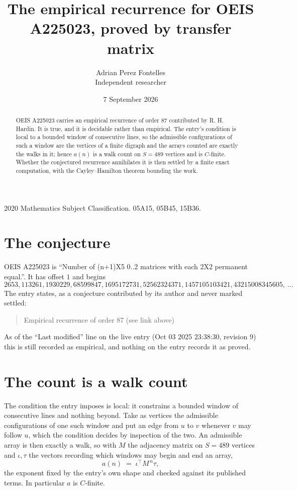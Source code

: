 \documentclass[11pt,a4paper]{article}
\title{The empirical recurrence for OEIS A225023, proved by transfer matrix}
\author{Adrian Perez Fontelles\\ \small Independent researcher}
\date{7 September 2026}
\theoremstyle{plain}
\theoremstyle{definition}
\begin{document}
\maketitle

\begin{abstract}
OEIS A225023 carries an empirical recurrence of order $87$ contributed by R. H. Hardin. It is
true, and it is decidable rather than empirical. The entry's condition is local to a bounded window of consecutive lines, so
the admissible configurations of such a window are the vertices of a finite digraph and the
arrays counted are exactly the walks in it; hence $a(n)$ is a walk count on $S=489$ vertices
and is $C$-finite. Whether the conjectured recurrence annihilates it is then settled by a
finite exact computation, with the Cayley--Hamilton theorem bounding the work.
\end{abstract}

\noindent\small 2020 Mathematics Subject Classification. 05A15, 05B45, 15B36.\normalsize

\section{The conjecture}

OEIS A225023 is ``Number of (n+1)X5 0..2 matrices with each 2X2 permanent equal.''. It has offset $1$ and begins
\[
2653, 113261, 1930229, 68599847, 1695172731, 52562324371, 1457105103421, 43215008345605,\ \dots
\]
The entry states, as a conjecture contributed by its author and never marked settled:
\begin{quote}
Empirical recurrence of order 87 (see link above)
\end{quote}
As of the ``Last modified'' line on the live entry (Oct 03 2025 23:38:30, revision 9) this is still
recorded as empirical, and nothing on the entry records it as proved.

\section{The count is a walk count}

The condition the entry imposes is local: it constrains a bounded window of consecutive lines and nothing beyond. Take as
vertices the admissible configurations of one such window and put an edge from $u$ to $v$
whenever $v$ may follow $u$, which the condition decides by inspection of the two. An
admissible array is then exactly a walk, so with $M$ the adjacency matrix on $S=489$ vertices
and $\iota,\tau$ the vectors recording which windows may begin and end an array,
\[
a(n)\;=\;\iota^{\!\top}M^{\,n}\tau ,
\]
the exponent fixed by the entry's own shape and checked against its published terms. In
particular $a$ is $C$-finite.
\end{document}
